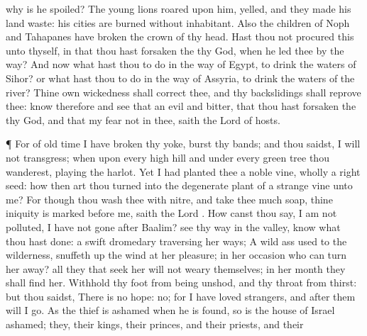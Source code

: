 {why is he
spoiled?
The young
lions
roared upon him,
{}
yelled, and they
made his
land
waste: his
cities are
burned without
inhabitant.
Also the
children of
Noph and
Tahapanes have
broken the crown of thy
head.
Hast thou not
procured this unto thyself, in that thou hast
forsaken the
{} thy
God,
when he
led thee by the
way?
And now what hast thou to do in the
way of
Egypt, to
drink the
waters of
Sihor? or what hast thou to do in the
way of
Assyria, to
drink the
waters of the
river?
Thine own
wickedness shall
correct thee, and thy
backslidings shall
reprove thee:
know therefore and
see that
{} an
evil
{} and
bitter, that thou hast
forsaken the
{} thy
God, and that my
fear
{} not in thee,
saith the
Lord
{} of
hosts.
\par }{\PP {}¶ For of old
time I have
broken thy
yoke,
{}
burst thy
bands; and thou
saidst, I will not
transgress; when upon every
high
hill and under every
green
tree thou
wanderest, playing the
harlot.
Yet I had
planted thee a noble
vine, wholly a
right
seed: how then art thou
turned into the degenerate
plant of a
strange
vine unto me?
For though thou
wash thee with
nitre, and take thee
much
soap,
{} thine
iniquity is
marked
before me,
saith the
Lord
{}.
How canst thou
say, I am not
polluted, I have not
gone
after
Baalim?
see thy
way in the
valley,
know what thou hast
done:
{} a
swift
dromedary
traversing her
ways;
A wild
ass
used to the
wilderness,
{} snuffeth
up the
wind at her
pleasure; in her
occasion who can turn her
away? all they that
seek her will not
weary themselves; in her
month they shall
find her.
Withhold thy
foot from being
unshod, and thy
throat from
thirst: but thou
saidst, There is no
hope: no; for I have
loved
strangers, and
after them will I
go.
As the
thief is
ashamed when he is
found, so is the
house of
Israel
ashamed; they, their
kings, their
princes, and their
priests, and their
}
